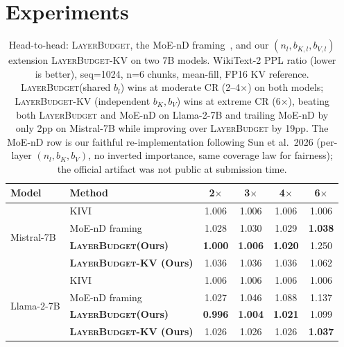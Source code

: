 \documentclass{article}
\newcommand{\layerbudget}{\textsc{LayerBudget}\xspace}
\begin{document}
\section{Experiments}
\label{sec:experiments}

\begin{table}[t]
\centering
\caption{Head-to-head: \layerbudget, the MoE-nD framing~\citep{moend2026}, and our $(n_l, b_{K,l}, b_{V,l})$ extension \layerbudget-KV on two 7B models.
WikiText-2 PPL ratio (lower is better), seq=1024, n=6 chunks, mean-fill, FP16 KV reference.
\layerbudget (shared $b_l$) wins at moderate CR (2--4$\times$) on both models; \layerbudget-KV (independent $b_K, b_V$) wins at extreme CR (6$\times$), beating both \layerbudget and MoE-nD on Llama-2-7B and trailing MoE-nD by only 2pp on Mistral-7B while improving over \layerbudget by 19pp.
The MoE-nD row is our faithful re-implementation following Sun et al.\ 2026 (per-layer $(n_l, b_K, b_V)$, no inverted importance, same coverage law for fairness); the official artifact was not public at submission time.}
\label{tab:moend-vs-lb}
\small
\begin{tabular}{@{}llcccc@{}}
\toprule
Model & Method & 2$\times$ & 3$\times$ & 4$\times$ & 6$\times$ \\
\midrule
\multirow{4}{*}{Mistral-7B}
 & KIVI                                    & 1.006 & 1.006 & 1.006 & 1.006 \\
 & MoE-nD framing~\citep{moend2026}        & 1.028 & 1.030 & 1.029 & \textbf{1.038} \\
 & \textbf{\layerbudget (Ours)}            & \textbf{1.000} & \textbf{1.006} & \textbf{1.020} & 1.250 \\
 & \textbf{\layerbudget-KV (Ours)}         & 1.036 & 1.036 & 1.036 & 1.062 \\
\midrule
\multirow{4}{*}{Llama-2-7B}
 & KIVI                                    & 1.006 & 1.006 & 1.006 & 1.006 \\
 & MoE-nD framing~\citep{moend2026}        & 1.027 & 1.046 & 1.088 & 1.137 \\
 & \textbf{\layerbudget (Ours)}            & \textbf{0.996} & \textbf{1.004} & \textbf{1.021} & 1.099 \\
 & \textbf{\layerbudget-KV (Ours)}         & 1.026 & 1.026 & 1.026 & \textbf{1.037} \\
\bottomrule
\end{tabular}
\end{table}
\end{document}
